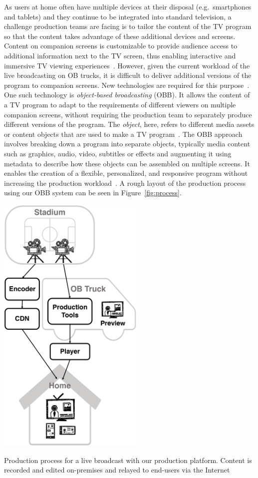 \documentclass[sigchi-a, authorversion]{acmart}
\begin{document}
As users at home often have multiple devices at their disposal (e.g.\ smartphones
and tablets) and they continue to be integrated
into standard television, a challenge production teams are facing is to tailor
the content of the TV program so that the content takes advantage of these
additional devices and screens. Content on companion screens is
customizable to provide audience access to additional information next to the TV
screen, thus enabling interactive and immersive TV viewing
experiences~\cite{bentley2017, dowell2015}. However, given the current workload
of the live broadcasting on OB trucks, it is difficult to deliver additional
versions of the program to companion screens. New technologies are required for
this purpose~\cite{Li:2018_TVX, armstrong2014}. One such technology is
\emph{object-based broadcasting} (OBB). It allows the content of a TV program to
adapt to the requirements of different viewers on multiple companion screens,
without requiring the production team to separately produce different versions
of the program. The \emph{object}, here, refers to different media assets or content
objects that are used to make a TV program~\cite{armstrong2014}. The OBB approach
involves breaking down a program into separate objects, typically
media content such as graphics, audio, video, subtitles or effects and augmenting
it using metadata to describe how these objects can be
assembled on multiple screens. It enables the creation of a flexible, personalized,
and responsive program without increasing the production
workload~\cite{kegel2017, armstrong2014}. A rough layout of the production process
using our OBB system can be seen in Figure~\ref{fig:process}.

\begin{marginfigure}
    \includegraphics[width=7cm]{Figures/process.png}
    \caption{Production process for a live broadcast with our production platform. Content is recorded and edited on-premises and relayed to end-users via the Internet}
    \label{fig:process}
\end{marginfigure}
\end{document}
